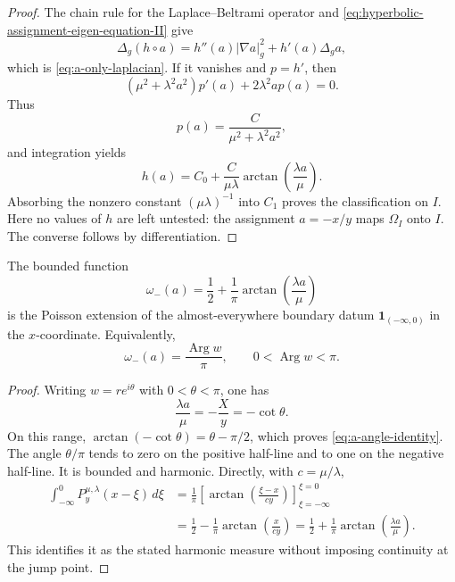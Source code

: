 \begin{proof}
The chain rule for the Laplace--Beltrami operator and
\eqref{eq:hyperbolic-assignment-eigen-equation-II} give
\[
 \Delta_g(h\circ a)
 =h''(a)|\nabla a|_g^2+h'(a)\Delta_ga,
\]
which is \eqref{eq:a-only-laplacian}.  If it vanishes and $p=h'$, then
\[
 (\mu^2+\lambda^2a^2)p'(a)+2\lambda^2a p(a)=0.
\]
Thus
\[
 p(a)=\frac{C}{\mu^2+\lambda^2a^2},
\]
and integration yields
\[
 h(a)=C_0+\frac{C}{\mu\lambda}
       \arctan\!\left(\frac{\lambda a}{\mu}\right).
\]
Absorbing the nonzero constant $(\mu\lambda)^{-1}$ into $C_1$ proves the
classification on $I$.  Here no values of $h$ are left untested: the assignment
$a=-x/y$ maps $\Omega_I$ onto $I$.  The converse follows by differentiation.
\end{proof}

\begin{corollary}
\label{cor:a-half-line-harmonic-measure}
The bounded function
\begin{equation}\label{eq:a-half-line-harmonic-measure}
 \omega_-(a)
 =\frac12+\frac1\pi
  \arctan\!\left(\frac{\lambda a}{\mu}\right)
\end{equation}
is the Poisson extension of the almost-everywhere boundary datum
$\mathbf 1_{(-\infty,0)}$ in the $x$-coordinate.  Equivalently,
\begin{equation}\label{eq:a-angle-identity}
 \omega_-(a)=\frac{\operatorname{Arg} w}{\pi},
 \qquad 0<\operatorname{Arg} w<\pi.
\end{equation}
\end{corollary}

\begin{proof}
Writing $w=re^{i\theta}$ with $0<\theta<\pi$, one has
\[
 \frac{\lambda a}{\mu}=-\frac{X}{y}=-\cot\theta.
\]
On this range,
$\arctan(-\cot\theta)=\theta-\pi/2$, which proves
\eqref{eq:a-angle-identity}.  The angle $\theta/\pi$ tends to zero on the
positive half-line and to one on the negative half-line.  It is bounded and
harmonic.  Directly, with $c=\mu/\lambda$,
\begin{align*}
 \int_{-\infty}^0P_y^{\mu,\lambda}(x-\xi)\,d\xi
 &=\frac1\pi\left[
   \arctan\!\left(\frac{\xi-x}{cy}\right)
   \right]_{\xi=-\infty}^{\xi=0}\\
 &=\frac12-\frac1\pi\arctan\!\left(\frac{x}{cy}\right)
  =\frac12+\frac1\pi\arctan\!\left(\frac{\lambda a}{\mu}\right).
\end{align*}
This identifies it as the stated harmonic measure without imposing continuity
at the jump point.
\end{proof}

